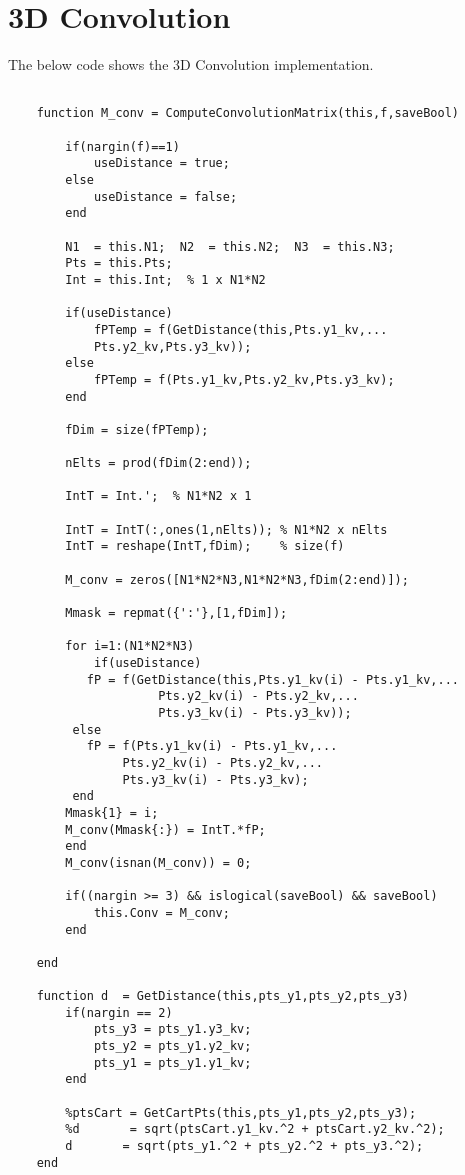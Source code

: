 \documentclass[11pt, a4paper]{article}
\theoremstyle{definition}
\begin{document}
\section{3D Convolution}
The below code shows the 3D Convolution implementation.
\begin{lstlisting}[frame=single]  % Start your code-block
    
    function M_conv = ComputeConvolutionMatrix(this,f,saveBool)
	
		if(nargin(f)==1)
			useDistance = true;
		else
			useDistance = false;
		end
	
		N1  = this.N1;  N2  = this.N2;  N3  = this.N3;
		Pts = this.Pts;
		Int = this.Int;  % 1 x N1*N2
		
		if(useDistance)
			fPTemp = f(GetDistance(this,Pts.y1_kv,...
			Pts.y2_kv,Pts.y3_kv));
		else
			fPTemp = f(Pts.y1_kv,Pts.y2_kv,Pts.y3_kv);
		end
		
		fDim = size(fPTemp);
		
		nElts = prod(fDim(2:end));
		
		IntT = Int.';  % N1*N2 x 1
		
		IntT = IntT(:,ones(1,nElts)); % N1*N2 x nElts
		IntT = reshape(IntT,fDim);    % size(f)
		
		M_conv = zeros([N1*N2*N3,N1*N2*N3,fDim(2:end)]);
		
		Mmask = repmat({':'},[1,fDim]);
		
		for i=1:(N1*N2*N3) 
	    	if(useDistance)
		   fP = f(GetDistance(this,Pts.y1_kv(i) - Pts.y1_kv,...
                     Pts.y2_kv(i) - Pts.y2_kv,...
  		             Pts.y3_kv(i) - Pts.y3_kv));
		 else
		   fP = f(Pts.y1_kv(i) - Pts.y1_kv,...
				Pts.y2_kv(i) - Pts.y2_kv,...
				Pts.y3_kv(i) - Pts.y3_kv);
		 end
		Mmask{1} = i;
		M_conv(Mmask{:}) = IntT.*fP;
		end
		M_conv(isnan(M_conv)) = 0;
		
		if((nargin >= 3) && islogical(saveBool) && saveBool)
			this.Conv = M_conv;
		end
	
	end   
	
	function d  = GetDistance(this,pts_y1,pts_y2,pts_y3)             
		if(nargin == 2)
			pts_y3 = pts_y1.y3_kv;
			pts_y2 = pts_y1.y2_kv;
			pts_y1 = pts_y1.y1_kv;
		end
		
		%ptsCart = GetCartPts(this,pts_y1,pts_y2,pts_y3);
		%d       = sqrt(ptsCart.y1_kv.^2 + ptsCart.y2_kv.^2); 
		d       = sqrt(pts_y1.^2 + pts_y2.^2 + pts_y3.^2);
	end
\end{lstlisting}
\end{document}
